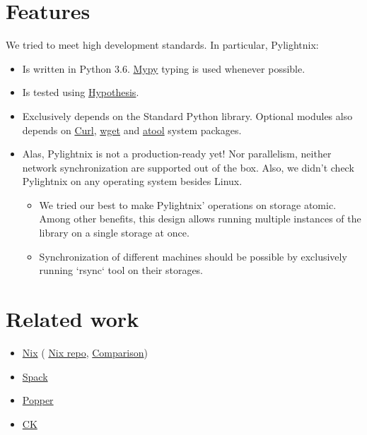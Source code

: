 \documentclass{article}
\begin{document}
\section{Features}

We tried to meet high development standards. In particular, Pylightnix:
\begin{itemize}
  \item Is written in Python 3.6. \href{http://mypy-lang.org/}{Mypy} typing is
    used whenever possible.
  \item Is tested using \href{https://pypi.org/project/hypothesis/}{Hypothesis}.
  \item Exclusively depends on the Standard Python library. Optional modules
    also depends on \href{https://curl.se/}{Curl},
    \href{https://www.gnu.org/software/wget/}{wget} and
    \href{https://www.nongnu.org/atool/}{atool} system packages.
  \item Alas, Pylightnix is not a production-ready yet! Nor parallelism, neither
    network synchronization are supported out of the box. Also, we didn't check
    Pylightnix on any operating system besides Linux.
    \begin{itemize}
      \item We tried our best to make Pylightnix' operations on storage atomic.
        Among other benefits, this design allows running multiple instances of
        the library on a single storage at once.
      \item Synchronization of different machines should be possible by
        exclusively running `rsync` tool on their storages.
    \end{itemize}
\end{itemize}

\section{Related work}

\begin{itemize}
  \item \href{https://nixos.org}{Nix} (
    \href{https://github.com/nixos/nix}{Nix repo},
    \href{./Comparison.md#Pylightnix-vs-Nix}{Comparison})
  \item \href{https://spack.io}{Spack}
  \item \href{https://falsifiable.us}{Popper}
  \item \href{https://cknowledge.org}{CK}
\end{itemize}
\end{document}
